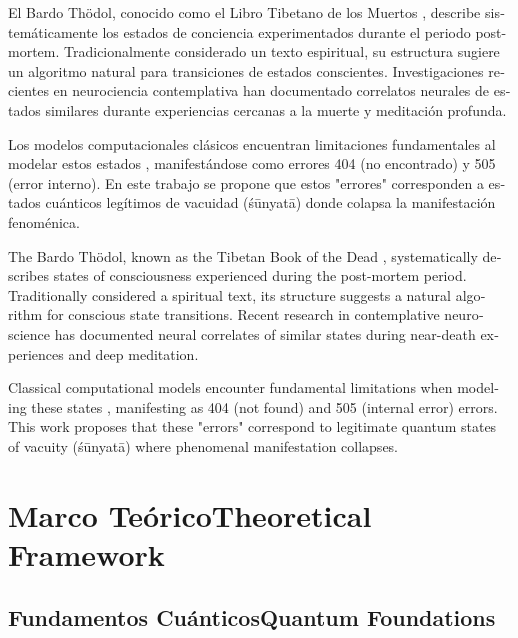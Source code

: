 \documentclass[12pt,a4paper]{article}
\newcommand{\es}[1]{\foreignlanguage{spanish}{#1}}
\newcommand{\en}[1]{\foreignlanguage{english}{#1}}
\begin{document}
\begin{otherlanguage}{spanish}
El Bardo Thödol, conocido como el Libro Tibetano de los Muertos \cite{trungpa1975}, describe sistemáticamente los estados de conciencia experimentados durante el periodo post-mortem. Tradicionalmente considerado un texto espiritual, su estructura sugiere un algoritmo natural para transiciones de estados conscientes. Investigaciones recientes en neurociencia contemplativa \cite{lutz2004} han documentado correlatos neurales de estados similares durante experiencias cercanas a la muerte y meditación profunda.

Los modelos computacionales clásicos encuentran limitaciones fundamentales al modelar estos estados \cite{tegmark2000}, manifestándose como errores 404 (no encontrado) y 505 (error interno). En este trabajo se propone que estos "errores" corresponden a estados cuánticos legítimos de vacuidad (śūnyatā) donde colapsa la manifestación fenoménica.
\end{otherlanguage}

\begin{otherlanguage}{english}
The Bardo Thödol, known as the Tibetan Book of the Dead \cite{trungpa1975}, systematically describes states of consciousness experienced during the post-mortem period. Traditionally considered a spiritual text, its structure suggests a natural algorithm for conscious state transitions. Recent research in contemplative neuroscience \cite{lutz2004} has documented neural correlates of similar states during near-death experiences and deep meditation.

Classical computational models encounter fundamental limitations when modeling these states \cite{tegmark2000}, manifesting as 404 (not found) and 505 (internal error) errors. This work proposes that these "errors" correspond to legitimate quantum states of vacuity (śūnyatā) where phenomenal manifestation collapses.
\end{otherlanguage}

\section{\es{Marco Teórico}\en{Theoretical Framework}}

\subsection{\es{Fundamentos Cuánticos}\en{Quantum Foundations}}
\end{document}

